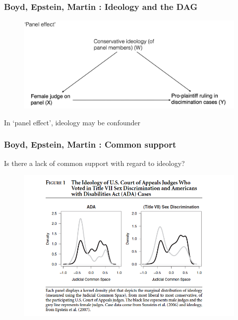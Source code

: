 \documentclass[12pt,english,dvipsnames,aspectratio=169,handout]{beamer}\usepackage[]{graphicx}\usepackage[]{xcolor}
\begin{document}
\begin{frame}
	\frametitle{Boyd, Epstein, Martin \citeyear{boyd_untangling_2010}: Ideology and the DAG}
	\footnotesize
  	 \begin{figure} 
    \includegraphics[height=.65\textheight,keepaspectratio=true]{../04-figures/06/04-w6_dag_panel}
    \end{figure}
    In `panel effect', ideology may be confounder
\end{frame}


\begin{frame}
	\frametitle{Boyd, Epstein, Martin \citeyear{boyd_untangling_2010}: Common support}
	\footnotesize
  Is there a lack of common support with regard to ideology?
  	 \begin{figure} 
    \includegraphics[height=.6\textheight,keepaspectratio=true]{../04-figures/06/05-w6_density}
    \end{figure}
\end{frame}
\end{document}

